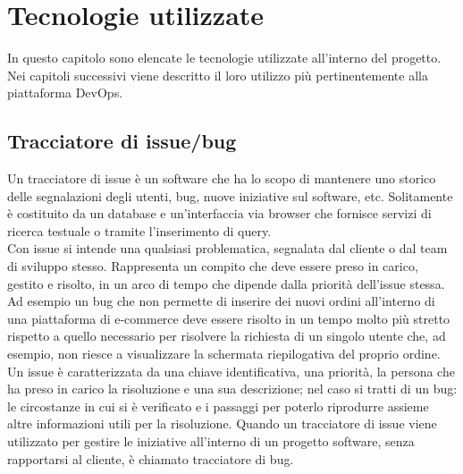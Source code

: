 \documentclass[a4paper, 12pt]{report}
\numberwithin{equation}{section}
\begin{document}
\chapter{Tecnologie utilizzate}\label{tecnologie}
In questo capitolo sono elencate le tecnologie utilizzate all’interno del progetto. Nei capitoli successivi viene descritto il loro utilizzo più pertinentemente alla piattaforma DevOps.

\section{Tracciatore di issue/bug}
Un tracciatore di issue è un software che ha lo scopo di mantenere uno storico delle segnalazioni degli utenti, bug, nuove iniziative sul software, etc. 
Solitamente è costituito da un database e un’interfaccia via browser che fornisce servizi di ricerca testuale o tramite l’inserimento di query.\\
Con issue si intende una qualsiasi problematica, segnalata dal cliente o dal team di sviluppo stesso. Rappresenta un compito che deve essere preso in carico, gestito e risolto, in un arco di tempo che dipende dalla priorità dell’issue stessa. Ad esempio un bug che non permette di inserire dei nuovi ordini all’interno di una piattaforma di e-commerce deve essere risolto in un tempo molto più stretto rispetto a quello necessario per risolvere la richiesta di un singolo utente che, ad esempio, non riesce a visualizzare la schermata riepilogativa del proprio ordine.\\
Un issue è caratterizzata da una chiave identificativa, una priorità, la persona che ha preso in carico la risoluzione e una sua descrizione; nel caso si tratti di un bug: le circostanze in cui si è verificato e i passaggi per poterlo riprodurre assieme altre informazioni utili per la risoluzione.
Quando un tracciatore di issue viene utilizzato per gestire le iniziative all’interno di un progetto software, senza rapportarsi al cliente, è chiamato tracciatore di bug.
\end{document}
